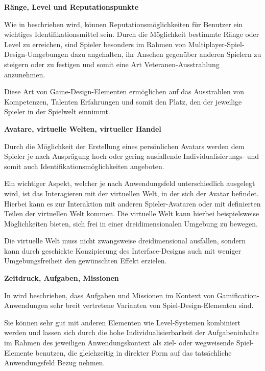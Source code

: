\documentclass[bibliography=totoc,listof=totoc,BCOR=5mm,DIV=12,oneside]{scrbook}
\begin{document}
\par \bigskip \textbf{Ränge, Level und Reputationspunkte}
\par Wie in \citep[Kapitel 4.5 Reputations, Ranks and Levels, Seite 75]{reeves2009total} beschrieben wird, können Reputationsmöglichkeiten für Benutzer ein wichtiges Identifikationsmittel sein. Durch die Möglichkeit bestimmte Ränge oder Level zu erreichen, sind Spieler besonders im Rahmen von Multiplayer-Spiel-Design-Umgebungen dazu angehalten, ihr Ansehen gegenüber anderen Spielern zu steigern oder zu festigen und somit eine Art Veteranen-Ausstrahlung anzunehmen.
\par Diese Art von Game-Design-Elementen ermöglichen auf das Ausstrahlen von Kompetenzen, Talenten Erfahrungen und somit den Platz, den der jeweilige Spieler in der Spielwelt einnimmt.

\par \bigskip \textbf{Avatare, virtuelle Welten, virtueller Handel}
\par Durch die Möglichkeit der Erstellung eines persönlichen Avatars werden dem Spieler je nach Ausprägung hoch oder gering ausfallende Individualisierungs- und somit auch Identifikationsmöglichkeiten angeboten. 
\par Ein wichtiger Aspekt, welcher je nach Anwendungsfeld unterschiedlich ausgelegt wird, ist das Interagieren mit der virtuellen Welt, in der sich der Avatar befindet. Hierbei kann es zur Interaktion mit anderen Spieler-Avataren oder mit definierten Teilen der virtuellen Welt kommen. Die virtuelle Welt kann hierbei beispielsweise Möglichkeiten bieten, sich frei in einer dreidimensionalen Umgebung zu bewegen. 
\par Die virtuelle Welt muss nicht zwangsweise dreidimensional ausfallen, sondern kann durch geschickte Konzipierung des Interface-Designs auch mit weniger Umgebungsfreiheit den gewünschten Effekt erzielen.

\par \bigskip \textbf{Zeitdruck, Aufgaben, Missionen}
\par In \citep[Kapitel 6.1.1 Tasks]{pflanzl2018gamification} wird beschrieben, dass Aufgaben und Missionen im Kontext von Gamification-Anwendungen sehr breit vertretene Varianten von Spiel-Design-Elementen sind. 
\par Sie können sehr gut mit anderen Elementen wie Level-Systemen kombiniert werden und lassen sich durch die hohe Individualisierbarkeit der Aufgabeninhalte im Rahmen des jeweiligen Anwendungskontext als ziel- oder wegweisende Spiel-Elemente benutzen, die gleichzeitig in direkter Form auf das tatsächliche Anwendungsfeld Bezug nehmen.
\end{document}
